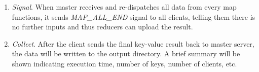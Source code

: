 \begin{enumerate}
\item \emph{Signal}. When master receives and re-dispatches all data from every map functions, it sends \emph{MAP_ALL_END} signal to all clients, telling them there is no further inputs and thus reducers can upload the result.

\item \emph{Collect}. After the client sends the final key-value result back to master server, the data will be written to the output directory. A brief summary will be shown indicating execution time, number of keys, number of clients, etc.

\end{enumerate}
